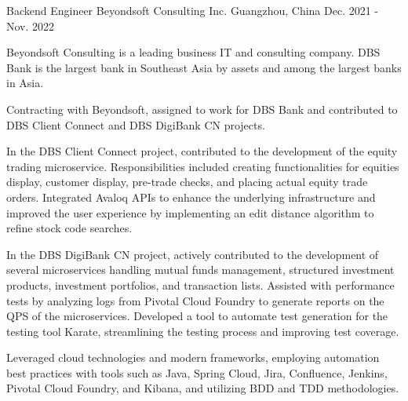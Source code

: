 \begin{cventries}
  \cventry
    {Backend Engineer} %
    {Beyondsoft Consulting Inc.} %
    {Guangzhou, China} %
    {Dec. 2021 - Nov. 2022} %
    {
      \begin{cvitems} %
        \item {Beyondsoft Consulting is a leading business IT and consulting company. DBS Bank is the largest bank in Southeast Asia by assets and among the largest banks in Asia.}
        \item {Contracting with Beyondsoft, assigned to work for DBS Bank and contributed to DBS Client Connect and DBS DigiBank CN projects.}
        \item {In the DBS Client Connect project, contributed to the development of the equity trading microservice. Responsibilities included creating functionalities for equities display, customer display, pre-trade checks, and placing actual equity trade orders. Integrated Avaloq APIs to enhance the underlying infrastructure and improved the user experience by implementing an edit distance algorithm to refine stock code searches.}
        \item {In the DBS DigiBank CN project, actively contributed to the development of several microservices handling mutual funds management, structured investment products, investment portfolios, and transaction lists. Assisted with performance tests by analyzing logs from Pivotal Cloud Foundry to generate reports on the QPS of the microservices. Developed a tool to automate test generation for the testing tool Karate, streamlining the testing process and improving test coverage.}
        \item {Leveraged cloud technologies and modern frameworks, employing automation best practices with tools such as Java, Spring Cloud, Jira, Confluence, Jenkins, Pivotal Cloud Foundry, and Kibana, and utilizing BDD and TDD methodologies.}
      \end{cvitems}
    }


\end{cventries}

